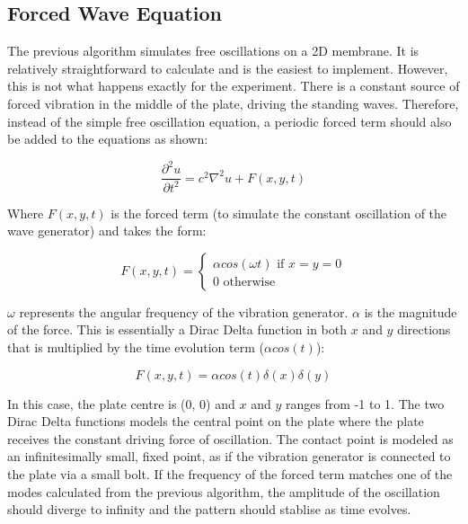 \subsection{Forced Wave Equation}

The previous algorithm simulates free oscillations on a 2D membrane. It is relatively straightforward to calculate and is the easiest to implement. However, this is not what happens exactly for the experiment. There is a constant source of forced vibration in the middle of the plate, driving the standing waves. Therefore, instead of the simple free oscillation equation, a periodic forced term should also be added to the equations as shown:

\begin{equation}
   \frac{\partial^2u}{\partial t^2} = c^2 \nabla^2u + F(x,y,t)
\end{equation}

Where $F(x,y,t)$ is the forced term (to simulate the constant oscillation of the wave generator) and takes the form:

\begin{equation}
    F(x,y,t) =
    \begin{cases}
        \alpha cos(\omega t) \text{ if } x = y= 0\\
        0 \text{ otherwise}
    \end{cases}
\end{equation}

$\omega$ represents the angular frequency of the vibration generator. $\alpha$ is the magnitude of the force. This is essentially a Dirac Delta function in both $x$ and $y$ directions that is multiplied by the time evolution term ($\alpha cos(t)$):

\begin{equation}
    F(x,y,t) = \alpha cos(t)\delta(x)\delta(y)
\end{equation}

In this case, the plate centre is (0, 0) and $x$ and $y$ ranges from -1 to 1. The two Dirac Delta functions models the central point on the plate where the plate receives the constant driving force of oscillation. The contact point is modeled as an infinitesimally small, fixed point, as if the vibration generator is connected to the plate via a small bolt. If the frequency of the forced term matches one of the modes calculated from the previous algorithm, the amplitude of the oscillation should diverge to infinity and the pattern should stablise as time evolves.

